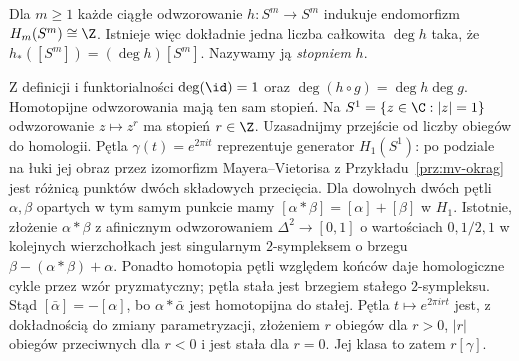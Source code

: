 \begin{definicja}
\label{def:stopien-sfer}
Dla $m\geq1$ każde ciągłe odwzorowanie
$h:S^m\to S^m$ indukuje
endomorfizm $H_m(S^m)\cong\Z$.
Istnieje więc dokładnie jedna
liczba całkowita $\deg h$ taka,
że $h_*([S^m])=(\deg h)[S^m]$.
Nazywamy ją \emph{stopniem} $h$.
\end{definicja}

Z definicji i funktorialności
$\deg(\id)=1$ oraz
$\deg(h\circ g)=\deg h\deg g$.
Homotopijne odwzorowania mają ten sam
stopień. Na $S^1=\{z\in\C:|z|=1\}$
odwzorowanie $z\mapsto z^r$ ma stopień $r\in\Z$.
Uzasadnijmy przejście od liczby obiegów do homologii.
Pętla $\gamma(t)=e^{2\pi it}$ reprezentuje generator $H_1(S^1)$:
po podziale na łuki jej obraz przez izomorfizm Mayera--Vietorisa
z Przykładu~\ref{prz:mv-okrag} jest różnicą punktów dwóch składowych przecięcia.
Dla dowolnych dwóch pętli $\alpha,\beta$ opartych w tym samym punkcie
mamy $[\alpha*\beta]=[\alpha]+[\beta]$ w $H_1$.
Istotnie, złożenie $\alpha*\beta$ z afinicznym odwzorowaniem
$\Delta^2\to[0,1]$ o wartościach $0,1/2,1$ w kolejnych wierzchołkach
jest singularnym $2$-sympleksem o brzegu
$\beta-(\alpha*\beta)+\alpha$.
Ponadto homotopia pętli względem końców daje homologiczne cykle
przez wzór pryzmatyczny; pętla stała jest brzegiem stałego $2$-sympleksu.
Stąd $[\bar\alpha]=-[\alpha]$, bo $\alpha*\bar\alpha$ jest
homotopijna do stałej. Pętla $t\mapsto e^{2\pi irt}$ jest,
z dokładnością do zmiany parametryzacji, złożeniem $r$ obiegów dla $r>0$,
$|r|$ obiegów przeciwnych dla $r<0$
i jest stała dla $r=0$. Jej klasa to zatem $r[\gamma]$.

